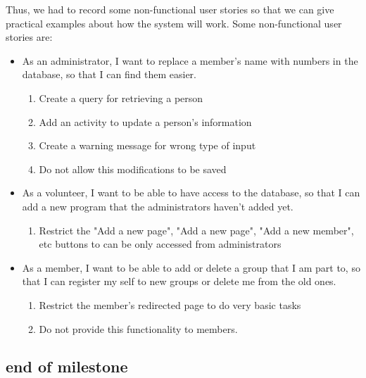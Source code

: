 \documentclass{l3proj}
\begin{document}
Thus, we had to record some non-functional user stories so that we can give practical examples about how the system will work. Some non-functional user stories are:

\begin{itemize}

\item  As an administrator, I want to replace a member's name with numbers in the database, so that I can find them easier.

	\begin{enumerate}
	
	\item Create a query for retrieving a person
	
	\item Add an activity to update a person's information
	
	\item Create a warning message for wrong type of input
	
	\item Do not allow this modifications to be saved
	\end{enumerate}
	
\item As a volunteer, I want to be able to have access to the database, so that I can add a new program that the administrators haven’t added yet.

	\begin{enumerate}
	\item Restrict the "Add a new page", "Add a new page", "Add a new member", etc buttons to can be only accessed from administrators
	\end{enumerate}
	
\item As a member, I want to be able to add or delete a group that I am part to, so that I can register my self to new groups or delete me from the old ones.

	\begin{enumerate}
	\item Restrict the member's redirected page to do very basic tasks
	\item Do not provide this functionality to members.
	\end{enumerate}

\end{itemize}





\subsection{end of milestone}
\end{document}
